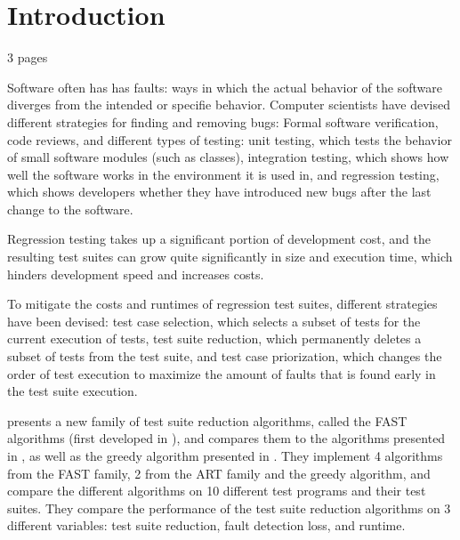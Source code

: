 
\chapter{Introduction}\label{chapter:introduction}

3 pages

Software often has has faults: ways in which the actual behavior of
the software diverges from the intended or specifie behavior. Computer
scientists have devised different strategies for finding and removing
bugs: Formal software verification, code reviews, and different types
of testing: unit testing, which tests the behavior of small software
modules (such as classes), integration testing, which shows how well the
software works in the environment it is used in, and regression testing,
which shows developers whether they have introduced new bugs after the
last change to the software.


Regression testing takes up a significant portion of development cost,
and the resulting test suites can grow quite significantly in size and
execution time, which hinders development speed and increases costs.

To mitigate the costs and runtimes of regression test suites, different
strategies have been devised: test case selection, which selects a subset
of tests for the current execution of tests, test suite reduction, which
permanently deletes a subset of tests from the test suite, and test case
priorization, which changes the order of test execution to maximize the
amount of faults that is found early in the test suite execution.

\cite{cruciani2019scalable} presents a new family of test suite
reduction algorithms, called the FAST algorithms (first developed in
\cite{miranda2018fast}), and compares them to the algorithms presented
in \cite{chen2010adaptive}, as well as the greedy algorithm presented
in \cite{rothermel2001prioritizing}. They implement 4 algorithms
from the FAST family, 2 from the ART family and the greedy algorithm,
and compare the different algorithms on 10 different test programs
and their test suites. They compare the performance of the test suite
reduction algorithms on 3 different variables: test suite reduction,
fault detection loss, and runtime.


